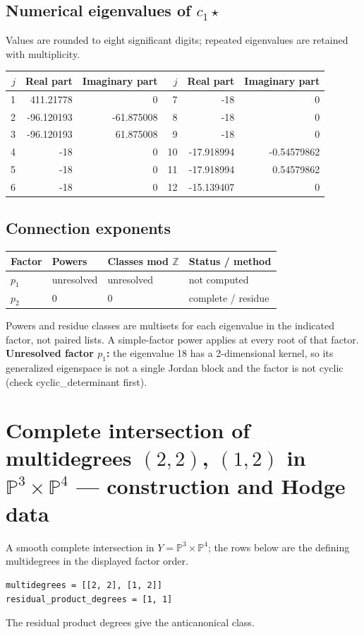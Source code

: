 \documentclass[10pt,a4paper]{article}
\begin{document}
\subsection*{Numerical eigenvalues of $c_1\star$}
Values are rounded to eight significant digits; repeated eigenvalues are retained with multiplicity.
\begin{center}\small\begin{tabular}{rrr@{\qquad}rrr}\toprule $j$ & Real part & Imaginary part & $j$ & Real part & Imaginary part\\\midrule
1 & 411.21778 & 0 & 7 & -18 & 0\\
2 & -96.120193 & -61.875008 & 8 & -18 & 0\\
3 & -96.120193 & 61.875008 & 9 & -18 & 0\\
4 & -18 & 0 & 10 & -17.918994 & -0.54579862\\
5 & -18 & 0 & 11 & -17.918994 & 0.54579862\\
6 & -18 & 0 & 12 & -15.139407 & 0\\
\bottomrule\end{tabular}\end{center}
\subsection*{Connection exponents}
\begin{center}\begin{tabular}{llll}\toprule Factor & Powers & Classes mod $\mathbb Z$ & Status / method\\\midrule
$p_{1}$ & unresolved & unresolved & not computed\\
$p_{2}$ & $0$ & $0$ & complete / residue\\
\bottomrule\end{tabular}\end{center}
Powers and residue classes are multisets for each eigenvalue in the indicated factor, not paired lists. A simple-factor power applies at every root of that factor.
\textbf{Unresolved factor $p_{1}$:} the eigenvalue 18 has a 2-dimensional kernel, so its generalized eigenspace is not a single Jordan block and the factor is not cyclic (check cyclic\_determinant first).
\clearpage\section*{Complete intersection of multidegrees $(2,2)$, $(1,2)$ in $\mathbb P^{3}\times \mathbb P^{4}$ --- construction and Hodge data}\label{entry:PROD5-D05}
A smooth complete intersection in $Y=\mathbb P^{3}\times\mathbb P^{4}$; the rows below are the defining multidegrees in the displayed factor order.
\begin{lstlisting}
multidegrees = [[2, 2], [1, 2]]
residual_product_degrees = [1, 1]
\end{lstlisting}
The residual product degrees give the anticanonical class.
\end{document}
